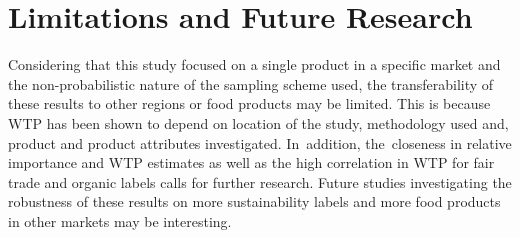 \documentclass[sustainability,article,accept,moreauthors,pdftex,10pt,a4paper]{Definitions/mdpi}
\theoremstyle{mdpi}
\newcounter{re}
\theoremstyle{mdpidefinition}
\begin{document}
{\section{Limitations and Future Research \label{sec6}}
\par{Considering that this study focused on a single product in a specific market and the non-probabilistic nature of the sampling scheme used, the transferability of these results to other regions or food products may be limited. This is because WTP has been shown to depend on location of the study, methodology used and, product and product attributes investigated. In~addition, the~closeness in relative importance and WTP estimates as well as the high correlation in WTP for fair trade and organic labels calls for further research. Future studies investigating the robustness of these results on more sustainability labels and more food products in other markets may be interesting.}
\vspace{6pt}





\appendix

}
\end{document}
